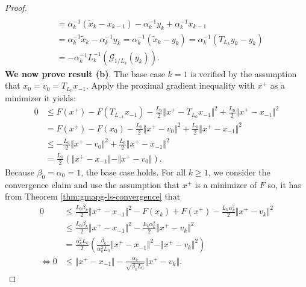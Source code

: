 \documentclass[12pt]{report}
\begin{document}
\begin{proof}
\begin{align*}
                \\
                &= \alpha_k^{-1}(\tilde x_k - x_{k - 1}) - \alpha_k^{-1}y_k + \alpha_k^{-1} x_{k - 1}
                \\
                &= \alpha_k^{-1}\tilde x_k - \alpha_k^{-1} y_k 
                = \alpha^{-1}_k(\tilde x_k - y_k) = \alpha_k^{-1}(T_{L_k} y_k - y_k)
                \\
                &= -\alpha_k^{-1}L_k^{-1}(\mathcal G_{1/L_k}(y_k)). 
            \end{align*}
            \textbf{We now prove result (b)}. 
            The base case $k = 1$ is verified by the assumption that $x_0 = v_0 = T_{L_0} x_{-1}$. 
            Apply the proximal gradient inequality with $x^+$ as a minimizer it yields: 
            \begin{align*}
                0 &\le 
                F(x^+) - F(T_{L_{-1}}x_{-1}) - \frac{L_0}{2}\Vert x^+ - T_{L_0}x_{-1}\Vert^2 + 
                \frac{L_0}{2}\Vert x^+ - x_{-1}\Vert^2
                \\
                &= 
                F(x^+) - F(x_0) - \frac{L_0}{2}\Vert x^+ - v_0\Vert^2 + 
                \frac{L_0}{2}\Vert x^+ - x_{-1}\Vert^2
                \\
                &\le 
                - \frac{L_0}{2}\Vert x^+ - v_0\Vert^2 + 
                \frac{L_0}{2}\Vert x^+ - x_{-1}\Vert^2
                \\
                &= \frac{L_0}{2}\left(
                    \Vert x^+ - x_{-1}\Vert- \Vert x^+ - v_0\Vert 
                \right). 
            \end{align*}
            Because $\beta_0 = \alpha_0 = 1$, the base case holds. 
            For all $k \ge 1$, we consider the convergence claim and use the assumption that $x^+$ is a minimizer of $F$ so, it has from Theorem \ref{thm:gmapg-ls-convergence} that 
            \begin{align*}
                0 &\le \frac{L_0\beta_k }{2}\Vert x^+ - x_{-1}\Vert^2 
                - F(x_k) + F(x^+) - \frac{L_k\alpha_k^2}{2}\Vert x^+ - v_k\Vert^2
                \\
                &\le 
                \frac{L_0\beta_k }{2}\Vert x^+ - x_{-1}\Vert^2 
                - \frac{L_k\alpha_k^2}{2}\Vert x^+ - v_k\Vert^2
                \\
                &= \frac{\alpha_k^2L_k}{2}\left(
                    \frac{\beta_k}{\alpha_k^2L_0}
                    \Vert x^+ - x_{-1}\Vert^2 
                    - \Vert x^+ - v_k\Vert^2
                \right)
                \\
                \iff 
                0 &\le 
                \Vert x^+ - x_{-1}\Vert - \frac{\alpha_k}{\sqrt{\beta_k L_0}}\Vert x^+ - v_k\Vert. 
            \end{align*}
        \end{proof}
\end{document}
